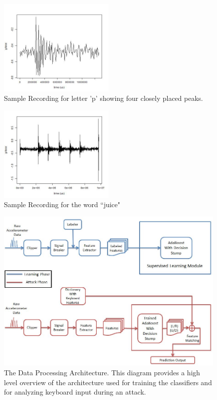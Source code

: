 \documentclass[11pt,conference]{IEEEtran}
\begin{document}
\begin{figure}
\centering
\includegraphics[width=0.5\textwidth]{img/p_566}
\caption{Sample Recording for letter 'p' showing four closely placed peaks.}
\label{fig:signal-p}
\end{figure}

\begin{figure}
\centering
\includegraphics[width=0.5\textwidth]{img/juice}
\caption{Sample Recording for the word ``juice"}
\label{fig:juice}
\end{figure}

\begin{figure}
\centering
\includegraphics[width=.9\textwidth]{flowchart1}
\caption{The Data Processing Architecture. This diagram provides a high level overview of the architecture used for training the
classifiers and for analyzing keyboard input during an attack.}
\label{fig:flowchart1}
\end{figure}
\end{document}
